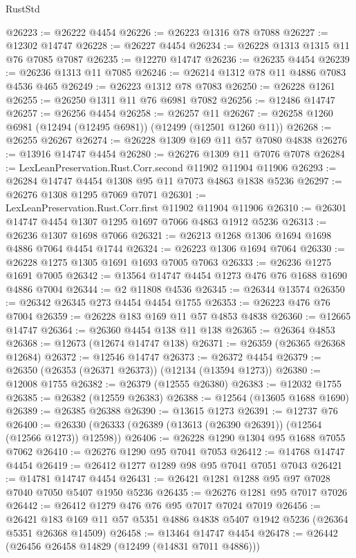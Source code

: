 \begin{lexlean}{RustStd}
\begin{coremodule}
@26223 := @26222 @4454
@26226 := @26223 @1316 @78 @7088
@26227 := @12302 @14747
@26228 := @26227 @4454
@26234 := @26228 @1313 @1315 @11 @76 @7085 @7087
@26235 := @12270 @14747
@26236 := @26235 @4454
@26239 := @26236 @1313 @11 @7085
@26246 := @26214 @1312 @78 @11 @4886 @7083 @4536 @465
@26249 := @26223 @1312 @78 @7083
@26250 := @26228 @1261
@26255 := @26250 @1311 @11 @76 @6981 @7082
@26256 := @12486 @14747
@26257 := @26256 @4454
@26258 := @26257 @11
@26267 := @26258 @1260 @6981 (@12494 (@12495 @6981)) (@12499 (@12501 @1260 @11))
@26268 := @26255 @26267
@26274 := @26228 @1309 @169 @11 @57 @7080 @4838
@26276 := @13916 @14747 @4454
@26280 := @26276 @1309 @11 @7076 @7078
@26284 := LexLeanPreservation.Rust.Corr.second @11902 @11904 @11906
@26293 := @26284 @14747 @4454 @1308 @95 @11 @7073 @4863 @1838 @5236
@26297 := @26276 @1308 @1295 @7069 @7071
@26301 := LexLeanPreservation.Rust.Corr.first @11902 @11904 @11906
@26310 := @26301 @14747 @4454 @1307 @1295 @1697 @7066 @4863 @1912 @5236
@26313 := @26236 @1307 @1698 @7066
@26321 := @26213 @1268 @1306 @1694 @1698 @4886 @7064 @4454 @1744
@26324 := @26223 @1306 @1694 @7064
@26330 := @26228 @1275 @1305 @1691 @1693 @7005 @7063
@26333 := @26236 @1275 @1691 @7005
@26342 := @13564 @14747 @4454 @1273 @476 @76 @1688 @1690 @4886 @7004
@26344 := @2 @11808 @4536
@26345 := @26344 @13574
@26350 := @26342 @26345 @273 @4454 @4454 @1755
@26353 := @26223 @476 @76 @7004
@26359 := @26228 @183 @169 @11 @57 @4853 @4838
@26360 := @12665 @14747
@26364 := @26360 @4454 @138 @11 @138
@26365 := @26364 @4853
@26368 := @12673 (@12674 @14747 @138)
@26371 := @26359 (@26365 @26368 @12684)
@26372 := @12546 @14747
@26373 := @26372 @4454
@26379 := @26350 (@26353 (@26371 @26373)) (@12134 (@13594 @1273))
@26380 := @12008 @1755
@26382 := @26379 (@12555 @26380)
@26383 := @12032 @1755
@26385 := @26382 (@12559 @26383)
@26388 := @12564 (@13605 @1688 @1690)
@26389 := @26385 @26388
@26390 := @13615 @1273
@26391 := @12737 @76
@26400 := @26330 (@26333 (@26389 (@13613 (@26390 @26391)) (@12564 (@12566 @1273)) @12598))
@26406 := @26228 @1290 @1304 @95 @1688 @7055 @7062
@26410 := @26276 @1290 @95 @7041 @7053
@26412 := @14768 @14747 @4454
@26419 := @26412 @1277 @1289 @98 @95 @7041 @7051 @7043
@26421 := @14781 @14747 @4454
@26431 := @26421 @1281 @1288 @95 @97 @7028 @7040 @7050 @5407 @1950 @5236
@26435 := @26276 @1281 @95 @7017 @7026
@26442 := @26412 @1279 @476 @76 @95 @7017 @7024 @7019
@26456 := @26421 @183 @169 @11 @57 @5351 @4886 @4838 @5407 @1942 @5236 (@26364 @5351 @26368 @14509)
@26458 := @13464 @14747 @4454
@26478 := @26442
    (@26456 @26458 @14829 (@12499 (@14831 @7011 @4886)))

\end{coremodule}
\end{lexlean}
